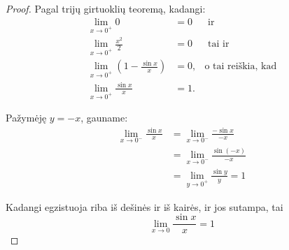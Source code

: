 \begin{exmp}
\begin{proof}
    Pagal trijų girtuoklių teoremą, kadangi:
    \begin{align*}
      \lim _{x \to 0^{+}} 0 &= 0 &\text{ ir } \\
      \lim _{x \to 0^{+}} \frac{x^2}{2} &= 0 &\text{ tai ir } \\
      \lim _{x \to 0^{+}} \left( 1 - \frac{\sin x}{x} \right) &= 0, 
        &\text{o tai reiškia, kad} \\
      \lim _{x \to 0^{+}} \frac{\sin x}{x} &= 1.
    \end{align*}

    Pažymėję $y = -x$, gauname:
    \begin{align*}
      \lim _{x \to 0^{-}} \frac{\sin x}{x} &=
      \lim _{x \to 0^{-}} \frac{-\sin x}{-x} \\
      &= \lim _{x \to 0^{-}} \frac{\sin(-x)}{-x} \\
      &= \lim _{y \to 0^{+}} \frac{\sin y}{y} = 1
    \end{align*}

    Kadangi egzistuoja riba iš dešinės ir iš kairės, ir jos sutampa, tai
    \begin{equation*}
      \lim _{x \to 0} \frac{\sin x}{x} = 1
    \end{equation*}

  \end{proof}

\end{exmp}

